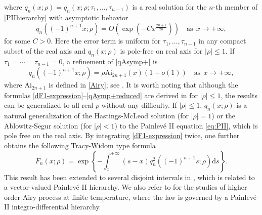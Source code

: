 \documentclass[11pt,a4paper]{article}
\numberwithin{equation}{section}
\begin{document}
where $q_{n}\left(x;\rho\right)=q_n(x;\rho;\tau_1,\ldots,\tau_{n-1})$ is a
real solution for the $n$-th member of \eqref{PIIhierarchy} %
with asymptotic behavior
\begin{equation}\label{qAsymp+}
q_{n}\left((-1)^{n+1}x;\rho\right)= O\left(
\exp\left(-C x^{\frac{2n+1}{2n}}\right) \right) \quad \mathrm{as}~~x\to+\infty,
\end{equation}%
for some $C>0$.
Here the error term is uniform for $\tau_1,\dots,\tau_{n-1}$ in any compact subset of the real axis and $q_n(x;\rho)$ is  pole-free on real axis for $|\rho|\leq1$.
If $\tau_1=\cdots=\tau_{n-1}=0$, a refinement of \eqref{qAsymp+} is
\begin{equation}\label{qAymp+reduced}
q_{n}\left((-1)^{n+1}x;\rho\right)=\rho\mathrm{Ai}_{2n+1}(x)(1+o(1))\quad \mathrm{as}~~x\to+\infty,
\end{equation}
where $\mathrm{Ai}_{2n+1}$ is defined in \eqref{Airy}; see \cite[Equation (1.13)]{CCG2021}. It is worth noting that although the formulas \eqref{dF1-expression}--\eqref{qAymp+reduced} are derived in \cite{CCG2021} for $|\rho|\leq 1$, the results can be generalized to all real $\rho$ without any difficulty. If $|\rho|\leq 1$, $q_n(x;\rho)$ is a natural generalization of the Hastings-McLeod solution (for $|\rho|=1$) or the
Ablowitz-Segur solution (for $|\rho|<1$) to the Painlev\'{e} II equation \eqref{eq:PII}, which is pole free on the real axis. By integrating
\eqref{dF1-expression} twice, one further obtains the following
Tracy-Widom type formula
\begin{equation}\label{F1-expression}
F_n(x;\rho)=\exp\left\{-\int_x^{+\infty}(s-x)
q_{n}^2\left((-1)^{n+1}s;\rho\right)\mathrm{d}s\right\}.
\end{equation}
This result has been extended to several disjoint intervals in \cite{CT2021}, which is related to a vector-valued Painlev\'e II hierarchy. We also refer to \cite{BCT} for the studies of higher order  Airy process at finite temperature, where  the law is governed by a Painlev\'{e} II integro-differential hierarchy.
\end{document}

